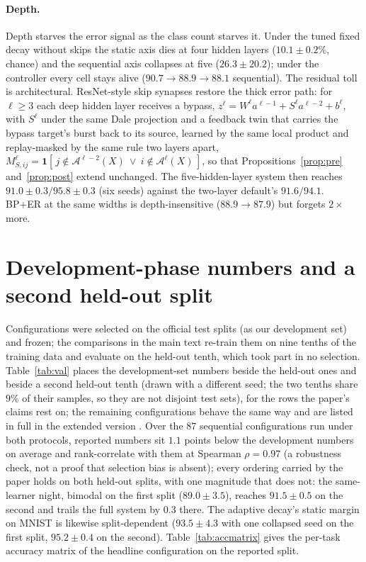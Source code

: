 \documentclass{article}
\begin{document}
\paragraph{Depth.} Depth starves the error signal as the class count starves it. Under the
tuned fixed decay without skips the static axis dies at four hidden layers ($10.1\pm0.2\%$,
chance) and the sequential axis collapses at five ($26.3\pm20.2$); under the controller
every cell stays alive ($90.7\to88.9\to88.1$ sequential). The residual toll is
architectural. ResNet-style skip synapses restore the thick error path: for $\ell\ge3$ each
deep hidden layer receives a bypass, $z^\ell=W^\ell a^{\ell-1}+S^\ell a^{\ell-2}+b^\ell$,
with $S^\ell$ under the same Dale projection and a feedback twin that carries the bypass
target's burst back to its source, learned by the same local product and replay-masked by
the same rule two layers apart,
$M^{\ell}_{S,ij}=\mathbf{1}[\,j\notin\mathcal{A}^{\ell-2}(X)\ \lor\ i\notin\mathcal{A}^{\ell}(X)\,]$,
so that Propositions~\ref{prop:pre} and~\ref{prop:post} extend unchanged. The
five-hidden-layer system then reaches $91.0\pm0.3/95.8\pm0.3$ (six seeds) against the
two-layer default's $91.6/94.1$. BP+ER at the same widths is depth-insensitive
($88.9\to87.9$) but forgets $2\times$ more.

\section{Development-phase numbers and a second held-out split}
\label{app:val}
Configurations were selected on the official test splits (as our development set) and frozen;
the comparisons in the main text re-train them on nine tenths of the training data and
evaluate on the held-out tenth, which took part in no selection. Table~\ref{tab:val} places
the development-set numbers beside the held-out ones and beside a second held-out tenth
(drawn with a different seed; the two tenths share $9\%$ of their samples, so they are not
disjoint test sets), for the rows the paper's claims rest on; the remaining configurations
behave the same way and are listed in full in the extended version
\citep{extended}. Over the $87$ sequential configurations run under both
protocols, reported numbers sit $1.1$ points below the development numbers on average and
rank-correlate with them at Spearman $\rho=0.97$ (a robustness check, not a proof that
selection bias is absent); every ordering carried by the paper holds on both held-out splits,
with one magnitude that does not: the same-learner night, bimodal on the first split
($89.0\pm3.5$), reaches $91.5\pm0.5$ on the second and trails the full system by $0.3$ there.
The adaptive decay's static margin on MNIST is likewise split-dependent ($93.5\pm4.3$ with one
collapsed seed on the first split, $95.2\pm0.4$ on the second). Table~\ref{tab:accmatrix}
gives the per-task accuracy matrix of the headline configuration on the reported split.
\end{document}
